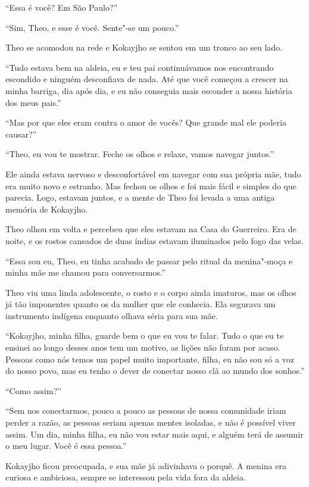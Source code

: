 ``Essa é você? Em São Paulo?''

``Sim, Theo, e esse é você. Sente"-se um pouco.''

Theo se acomodou na rede e Kokayjho se sentou em um tronco ao seu lado.

``Tudo estava bem na aldeia, eu e teu pai continuávamos nos encontrando
escondido e ninguém desconfiava de nada. Até que você começou a crescer
na minha barriga, dia após dia, e eu não conseguia mais esconder a nossa
história dos meus pais.''

``Mas por que eles eram contra o amor de vocês? Que grande mal ele
poderia causar?''

``Theo, eu vou te mostrar. Feche os olhos e relaxe, vamos navegar
juntos.''

Ele ainda estava nervoso e desconfortável em navegar com sua própria
mãe, tudo era muito novo e estranho. Mas fechou os olhos e foi mais
fácil e simples do que parecia. Logo, estavam juntos, e a mente de
Theo foi levada a uma antiga memória de Kokayjho.

\asterisc


Theo olhou em volta e percebeu que eles estavam na Casa do Guerreiro.
Era de noite, e os rostos cansados de duas índias estavam iluminados pelo
fogo das velas.

``Essa sou eu, Theo, eu tinha acabado de passar pelo ritual da
menina"-moça e minha mãe me chamou para conversarmos.''

Theo viu uma linda adolescente, o rosto e o corpo ainda imaturos, mas os
olhos já tão imponentes quanto os da mulher que ele conhecia. Ela
segurava um instrumento indígena enquanto olhava séria para sua mãe.

``Kokayjho, minha filha, guarde bem o que eu vou te falar. Tudo o que eu
te ensinei ao longo desses anos tem um motivo, as lições não foram por
acaso. Pessoas como nós temos um papel muito importante, filha, eu não
sou só a voz do nosso povo, mas eu tenho o dever de conectar nosso clã
ao mundo dos sonhos.''

``Como assim?''

``Sem nos conectarmos, pouco a pouco as pessoas de nossa comunidade
iriam perder a razão, as pessoas seriam apenas mentes isoladas, e não é
possível viver assim. Um dia, minha filha, eu não vou estar mais aqui, e
alguém terá de assumir o meu lugar. Você é essa pessoa.''

Kokayjho ficou preocupada, e sua mãe já adivinhava o porquê. A menina era
curiosa e ambiciosa, sempre se interessou pela vida fora da aldeia.

